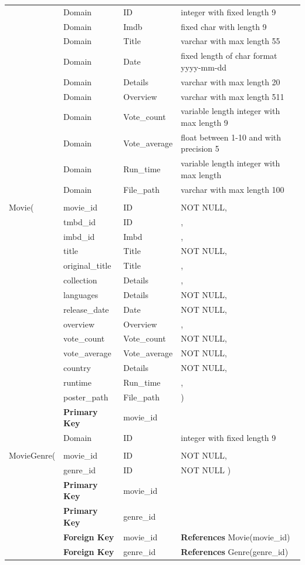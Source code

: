 \documentclass[12pt]{article}
\begin{document}
\begin{table}[H]
\centering
\renewcommand\arraystretch{1.12}
	\begin{tabular}{l l l l}
		\hline
		&Domain & ID & integer with fixed length 9\\
		&Domain & Imdb & fixed char with length 9\\
        &Domain & Title & varchar with max length 55\\
        &Domain & Date  & fixed length of char format yyyy-mm-dd\\
        &Domain & Details & varchar with max length 20\\
        &Domain & Overview & varchar with max length 511\\
        &Domain & Vote\_count & variable length integer with max length 9\\
        &Domain & Vote\_average & float between 1-10 and with precision 5\\
        &Domain & Run\_time  & variable length integer with max length\\
        &Domain & File\_path & varchar with max length 100\\&&&
        \\Movie(&movie\_id&ID&NOT NULL,\\
        &tmbd\_id&ID&,\\
        &imbd\_id&Imbd&,\\
        &title&Title&NOT NULL,\\
        &original\_title&Title&,\\
        &collection&Details&,\\
        &languages&Details&NOT NULL,\\
        &release\_date&Date&NOT NULL,\\
        &overview&Overview&,\\
        &vote\_count&Vote\_count&NOT NULL,\\
        &vote\_average&Vote\_average&NOT NULL,\\
        &country&Details&NOT NULL,\\
        &runtime&Run\_time&,\\
        &poster\_path&File\_path&  \hspace{4PT} )\\
        &\textbf{Primary Key}& movie\_id&\\
		\hline 
		&Domain & ID & integer with fixed length 9\\&&&
        \\MovieGenre(&movie\_id&ID&NOT NULL,\\& genre\_id&ID&NOT NULL \hspace{4PT} )\\
        &\textbf{Primary Key}& movie\_id&\\
        &\textbf{Primary Key}& genre\_id&\\
        &\textbf{Foreign Key}& movie\_id &\textbf{References} Movie(movie\_id)\\
        &\textbf{Foreign Key}& genre\_id&\textbf{References} Genre(genre\_id)\\
        

\end{tabular}
\end{table}
\end{document}
